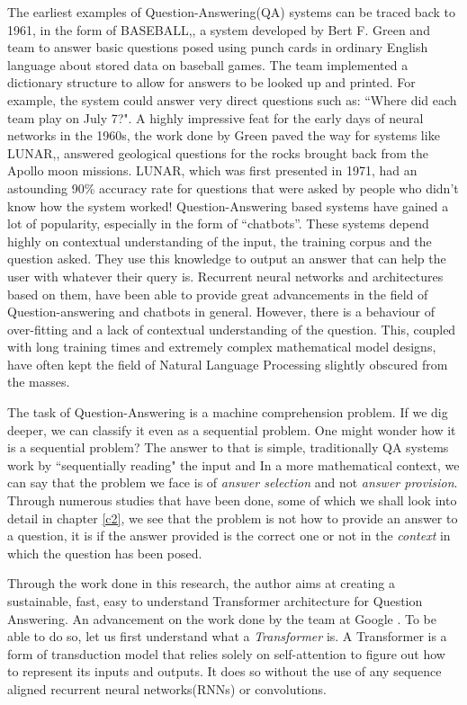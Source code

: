 \documentclass[a4paper,12pt]{report}
\begin{document}
    The earliest examples of Question-Answering(QA) systems can be traced back to 1961, in the form of BASEBALL,\citep{green1961baseball}, a system developed by Bert F. Green and team to answer basic questions posed using punch cards in ordinary English language about stored data on baseball games. The team implemented a dictionary structure to allow for answers to be looked up and printed. For example, the system could answer very direct questions such as: ``Where did each team play on July 7?".
    A highly impressive feat for the early days of neural networks in the 1960s, the work done by Green paved the way for systems like LUNAR,\citep{lunar}, answered geological questions for the rocks brought back from the Apollo moon missions. LUNAR, which was first presented in 1971, had an astounding 90\% accuracy rate for questions that were asked by people who didn't know how the system worked!
    Question-Answering based systems have gained a lot of popularity, especially in the form of ``chatbots''. These systems depend highly on contextual understanding of the input, the training corpus and the question asked. They use this knowledge to output an answer that can help the user with whatever their query is. Recurrent neural networks and architectures based on them, have been able to provide great advancements in the field of Question-answering and chatbots in general. However, there is a behaviour of over-fitting and a lack of contextual understanding of the question. This, coupled with long training times and extremely complex mathematical model designs, have often kept the field of Natural Language Processing slightly obscured from the masses.


    The task of Question-Answering is a machine comprehension problem. If we dig deeper, we can classify it even as a sequential problem. One might wonder how it is a sequential problem? The answer to that is simple, traditionally QA systems work by ``sequentially reading" the input and
    In a more mathematical context, we can say that the problem we face is of \textit{answer selection} and not \textit{answer provision}. Through numerous studies that have been done, some of which we shall look into detail in chapter \ref{c2}, we see that the problem is not how to provide an answer to a question, it is if the answer provided is the correct one or not in the \textit{context} in which the question has been posed.

    Through the work done in this research, the author aims at creating a sustainable, fast, easy to understand Transformer architecture for Question Answering. An advancement on the work done by the team at Google \citep{atayl}. To be able to do so, let us first understand what a \textit{Transformer} is.
    A Transformer is a form of transduction model that relies solely on self-attention to figure out how to represent its inputs and outputs. It does so without the use of any sequence aligned recurrent neural networks(RNNs) or convolutions.
\end{document}
